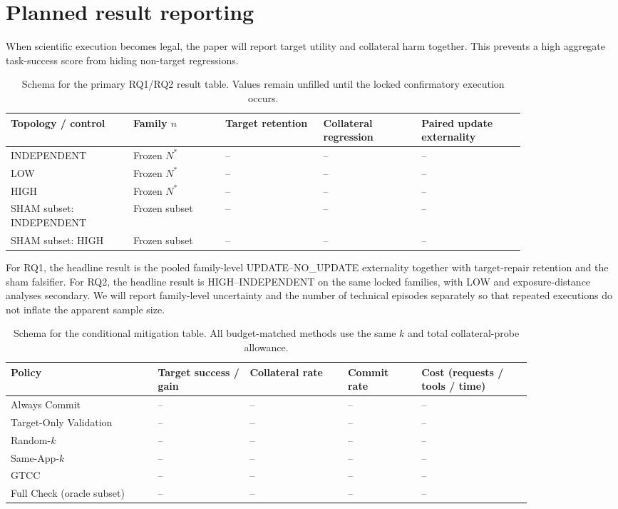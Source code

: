 \documentclass{article}
\begin{document}
\section{Planned result reporting}
\label{app:reporting}
When scientific execution becomes legal, the paper will report target utility and collateral harm together. This prevents a high aggregate task-success score from hiding non-target regressions.

\begin{table}[h]
\centering
\caption{Schema for the primary RQ1/RQ2 result table. Values remain unfilled until the locked confirmatory execution occurs.}
\label{tab:primary-schema}
\small
\begin{tabular}{p{0.20\linewidth}p{0.15\linewidth}p{0.16\linewidth}p{0.16\linewidth}p{0.17\linewidth}}
\toprule
Topology / control & Family $n$ & Target retention & Collateral regression & Paired update externality \\
\midrule
INDEPENDENT & Frozen $N^*$ & -- & -- & -- \\
LOW & Frozen $N^*$ & -- & -- & -- \\
HIGH & Frozen $N^*$ & -- & -- & -- \\
SHAM subset: INDEPENDENT & Frozen subset & -- & -- & -- \\
SHAM subset: HIGH & Frozen subset & -- & -- & -- \\
\bottomrule
\end{tabular}
\end{table}

For RQ1, the headline result is the pooled family-level UPDATE--NO\_UPDATE externality together with target-repair retention and the sham falsifier. For RQ2, the headline result is HIGH--INDEPENDENT on the same locked families, with LOW and exposure-distance analyses secondary. We will report family-level uncertainty and the number of technical episodes separately so that repeated executions do not inflate the apparent sample size.

\begin{table}[h]
\centering
\caption{Schema for the conditional mitigation table. All budget-matched methods use the same $k$ and total collateral-probe allowance.}
\label{tab:policy-schema}
\small
\begin{tabular}{p{0.24\linewidth}p{0.15\linewidth}p{0.16\linewidth}p{0.12\linewidth}p{0.18\linewidth}}
\toprule
Policy & Target success / gain & Collateral rate & Commit rate & Cost (requests / tools / time) \\
\midrule
Always Commit & -- & -- & -- & -- \\
Target-Only Validation & -- & -- & -- & -- \\
Random-$k$ & -- & -- & -- & -- \\
Same-App-$k$ & -- & -- & -- & -- \\
GTCC & -- & -- & -- & -- \\
Full Check (oracle subset) & -- & -- & -- & -- \\
\bottomrule
\end{tabular}
\end{table}
\end{document}
